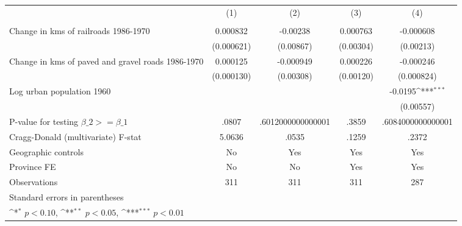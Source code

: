 {
\def\sym#1{\ifmmode^{#1}\else\(^{#1}\)\fi}
\begin{tabular}{l*{4}{c}}
\hline\hline
                &\multicolumn{1}{c}{(1)}&\multicolumn{1}{c}{(2)}&\multicolumn{1}{c}{(3)}&\multicolumn{1}{c}{(4)}\\
                &\multicolumn{1}{c}{}&\multicolumn{1}{c}{}&\multicolumn{1}{c}{}&\multicolumn{1}{c}{}\\
\hline
Change in kms of railroads 1986-1970& 0.000832         & -0.00238         & 0.000763         &-0.000608         \\
                &(0.000621)         &(0.00867)         &(0.00304)         &(0.00213)         \\
[1em]
Change in kms of paved and gravel roads 1986-1970& 0.000125         &-0.000949         & 0.000226         &-0.000246         \\
                &(0.000130)         &(0.00308)         &(0.00120)         &(0.000824)         \\
[1em]
Log urban population 1960&                  &                  &                  &  -0.0195\sym{***}\\
                &                  &                  &                  &(0.00557)         \\
\hline
P-value for testing $\beta\_{2} >= \beta\_{1}$&    .0807         &.6012000000000001         &    .3859         &.6084000000000001         \\
Cragg-Donald (multivariate) F-stat&   5.0636         &    .0535         &    .1259         &    .2372         \\
Geographic controls&       No         &      Yes         &      Yes         &      Yes         \\
Province FE     &       No         &       No         &      Yes         &      Yes         \\
Observations    &      311         &      311         &      311         &      287         \\
\hline\hline
\multicolumn{5}{l}{\footnotesize Standard errors in parentheses}\\
\multicolumn{5}{l}{\footnotesize \sym{*} \(p<0.10\), \sym{**} \(p<0.05\), \sym{***} \(p<0.01\)}\\
\end{tabular}
}
